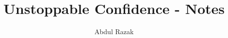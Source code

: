 \documentclass[a4paper,12pt]{book}
\begin{document}
    \author{Abdul Razak}
    \title{Unstoppable Confidence - Notes}

    \maketitle
    \tableofcontents
    \mainmatter

        
\end{document}
